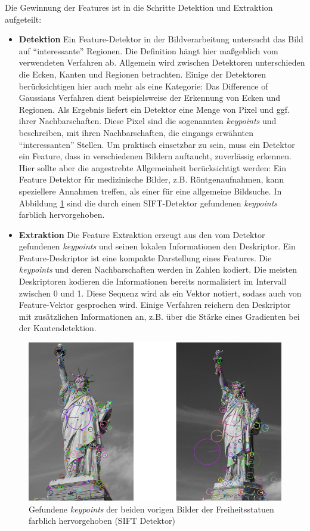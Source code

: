 Die Gewinnung der Features ist in die Schritte Detektion und Extraktion aufgeteilt: 

\begin{itemize}
	\item \textbf{Detektion} Ein Feature-Detektor in der Bildverarbeitung untersucht das Bild auf \enquote{interessante} Regionen. Die Definition hängt hier maßgeblich vom verwendeten Verfahren ab. Allgemein wird zwischen Detektoren unterschieden die Ecken, Kanten und Regionen betrachten. Einige der Detektoren berücksichtigen hier auch mehr als eine Kategorie: Das Difference of Gaussians Verfahren dient beispielsweise der Erkennung von Ecken und Regionen. Als Ergebnis liefert ein Detektor eine Menge von Pixel und ggf. ihrer Nachbarschaften. Diese Pixel sind die sogenannten \textit{keypoints} und beschreiben, mit ihren Nachbarschaften, die eingangs erwähnten \enquote{interessanten} Stellen.\newline
	 Um praktisch einsetzbar zu sein, muss ein Detektor ein Feature, dass in verschiedenen Bildern auftaucht, zuverlässig erkennen. Hier sollte aber die angestrebte Allgemeinheit berücksichtigt werden: Ein Feature Detektor für medizinische Bilder, z.B. Röntgenaufnahmen, kann speziellere Annahmen treffen, als einer für eine allgemeine Bildsuche. In Abbildung \ref{img:keypoints} sind die durch einen SIFT-Detektor gefundenen \textit{keypoints} farblich hervorgehoben.
	\item \textbf{Extraktion} Die Feature Extraktion erzeugt aus den vom Detektor gefundenen \textit{keypoints} und seinen lokalen Informationen den Deskriptor. Ein Feature-Deskriptor ist eine kompakte Darstellung eines Features. Die \textit{keypoints} und deren Nachbarschaften werden in Zahlen kodiert. Die meisten Deskriptoren kodieren die Informationen bereits normalisiert im Intervall zwischen 0 und 1. Diese Sequenz wird als ein Vektor notiert, sodass auch von Feature-Vektor gesprochen wird. Einige Verfahren reichern den Deskriptor mit zusätzlichen Informationen an, z.B. über die Stärke eines Gradienten bei der Kantendetektion.
\end{itemize}

\begin{figure}
	\centering
	\includegraphics[scale=0.6]{images/liberty_kp.png}
	\caption{Gefundene \textit{keypoints} der beiden vorigen Bilder der Freiheitsstatuen farblich hervorgehoben (SIFT Detektor)}
	\label{img:keypoints}
\end{figure}

